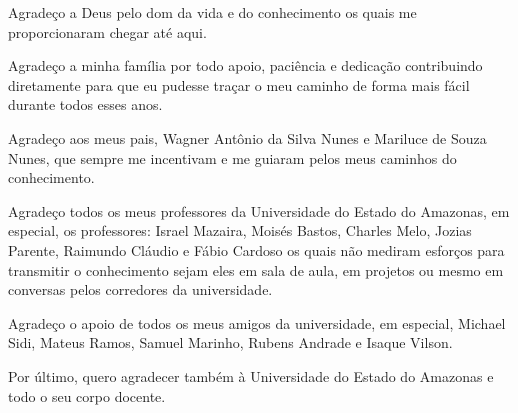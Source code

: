 
\begin{agradecimentos}[AGRADECIMENTOS]

Agradeço a Deus pelo dom da vida e do conhecimento os quais me proporcionaram chegar até aqui.

Agradeço a minha família por todo apoio, paciência e dedicação contribuindo diretamente para que eu pudesse traçar o meu caminho de forma mais fácil durante todos esses anos.

Agradeço aos meus pais, Wagner Antônio da Silva Nunes e Mariluce de Souza Nunes, que sempre me incentivam e me guiaram pelos meus caminhos do conhecimento.

Agradeço todos os meus professores da Universidade do Estado do Amazonas, em especial, os professores: Israel Mazaira, Moisés Bastos, Charles Melo, Jozias Parente, Raimundo Cláudio e Fábio Cardoso os quais não mediram esforços para transmitir o conhecimento sejam eles em sala de aula, em projetos ou mesmo em conversas pelos corredores da universidade.

Agradeço o apoio de todos os meus amigos da universidade, em especial, Michael Sidi, Mateus Ramos, Samuel Marinho, Rubens Andrade e Isaque Vilson.

Por último, quero agradecer também à Universidade do Estado do Amazonas e todo o seu corpo docente.


\end{agradecimentos}
